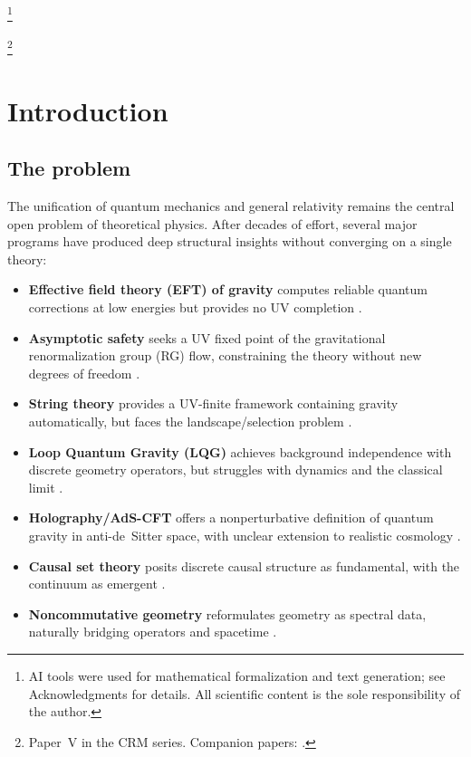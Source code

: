 \documentclass[aps,prd,twocolumn,superscriptaddress,nofootinbib]{revtex4-2}
\begin{document}
\thanks{AI tools were used for mathematical formalization and text generation; see Acknowledgments for details. All scientific content is the sole responsibility of the author.}

\thanks{Paper~V in the CRM series. Companion papers: \cite{Geiger2026,Geiger2026b,Geiger2026c,Geiger2026d}.}

\maketitle


\section{Introduction}
\label{sec:intro}

\subsection{The problem}

The unification of quantum mechanics and general relativity remains the central open problem of theoretical physics. After decades of effort, several major programs have produced deep structural insights without converging on a single theory:

\begin{itemize}
\item \textbf{Effective field theory (EFT) of gravity} computes reliable quantum corrections at low energies but provides no UV completion \cite{Donoghue1994}.
\item \textbf{Asymptotic safety} seeks a UV fixed point of the gravitational renormalization group (RG) flow, constraining the theory without new degrees of freedom \cite{Weinberg1979,Reuter1998,Percacci2017}.
\item \textbf{String theory} provides a UV-finite framework containing gravity automatically, but faces the landscape/selection problem \cite{Polchinski1998}.
\item \textbf{Loop Quantum Gravity (LQG)} achieves background independence with discrete geometry operators, but struggles with dynamics and the classical limit \cite{Rovelli2004,Thiemann2007}.
\item \textbf{Holography/AdS-CFT} offers a nonperturbative definition of quantum gravity in anti-de~Sitter space, with unclear extension to realistic cosmology \cite{Maldacena1999}.
\item \textbf{Causal set theory} posits discrete causal structure as fundamental, with the continuum as emergent \cite{Sorkin2003,Surya2019}.
\item \textbf{Noncommutative geometry} reformulates geometry as spectral data, naturally bridging operators and spacetime \cite{Connes1994}.
\end{itemize}
\end{document}
